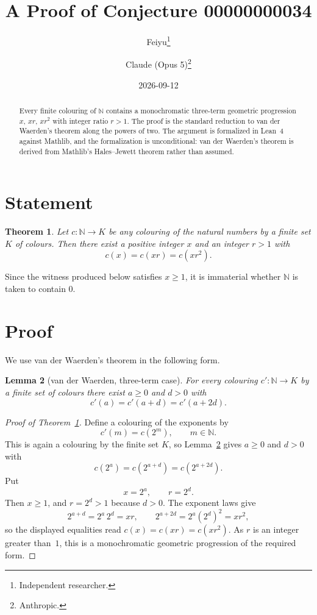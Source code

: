 \documentclass[11pt]{article}
\title{A Proof of Conjecture 00000000034}
\author{%
  Feiyu\thanks{Independent researcher.}
  \and
  Claude (Opus 5)\thanks{Anthropic.}%
}
\date{2026-09-12}
\theoremstyle{plain}
\newtheorem{theorem}{Theorem}
\newtheorem{lemma}[theorem]{Lemma}
\theoremstyle{remark}
\begin{document}
\maketitle

\begin{abstract}
Every finite colouring of $\mathbb N$ contains a monochromatic three-term
geometric progression $x,\,xr,\,xr^2$ with integer ratio $r>1$. The proof is
the standard reduction to van der Waerden's theorem along the powers of two.
The argument is formalized in Lean~4 against Mathlib, and the formalization is
unconditional: van der Waerden's theorem is derived from Mathlib's
Hales--Jewett theorem rather than assumed.
\end{abstract}

\section{Statement}

\begin{theorem}\label{thm:main}
Let $c:\mathbb N\to K$ be any colouring of the natural numbers by a finite set
$K$ of colours. Then there exist a positive integer $x$ and an integer $r>1$
with
\[
  c(x)=c(xr)=c(xr^2).
\]
\end{theorem}

Since the witness produced below satisfies $x\ge1$, it is immaterial whether
$\mathbb N$ is taken to contain $0$.

\section{Proof}

We use van der Waerden's theorem in the following form.

\begin{lemma}[van der Waerden, three-term case]\label{lem:vdw}
For every colouring $c':\mathbb N\to K$ by a finite set of colours there exist
$a\ge0$ and $d>0$ with
\[
  c'(a)=c'(a+d)=c'(a+2d).
\]
\end{lemma}

\begin{proof}[Proof of Theorem~\ref{thm:main}]
Define a colouring of the exponents by
\[
  c'(m)=c(2^m),\qquad m\in\mathbb N .
\]
This is again a colouring by the finite set $K$, so Lemma~\ref{lem:vdw} gives
$a\ge0$ and $d>0$ with
\[
  c(2^a)=c(2^{a+d})=c(2^{a+2d}).
\]
Put
\[
  x=2^a,\qquad r=2^d .
\]
Then $x\ge1$, and $r=2^d>1$ because $d>0$. The exponent laws give
\[
  2^{a+d}=2^a\,2^d=xr,
  \qquad
  2^{a+2d}=2^a\left(2^d\right)^2=xr^2 ,
\]
so the displayed equalities read $c(x)=c(xr)=c(xr^2)$. As $r$ is an integer
greater than~$1$, this is a monochromatic geometric progression of the required
form.
\end{proof}
\end{document}
